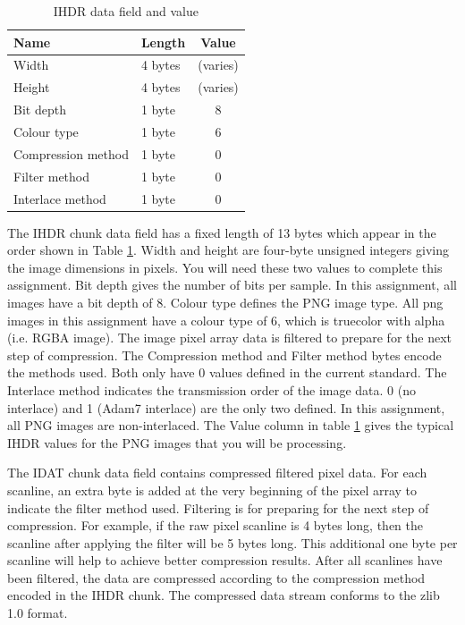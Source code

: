 \begin{table}
	\begin{center}
		\begin{tabular}{llc}             \toprule
			Name               & Length  & Value \\ \midrule
			Width              & 4 bytes & (varies)\\ \midrule
			Height             & 4 bytes & (varies)\\ \midrule
			Bit depth          & 1 byte  & 8\\ \midrule
			Colour type        & 1 byte  & 6\\ \midrule
			Compression method & 1 byte  & 0\\ \midrule
			Filter method      & 1 byte  & 0\\ \midrule
			Interlace method   & 1 byte  & 0\\ \bottomrule
		\end{tabular}
		\caption{IHDR data field and value}
		\label{lab1:tb_IHDR_Data}
	\end{center}
\end{table}
The IHDR chunk data field has a fixed length of 13 bytes which appear in the order shown in Table \ref{lab1:tb_IHDR_Data}. Width and height are four-byte unsigned integers giving the image dimensions in pixels. You will need these two values to complete this assignment. Bit depth gives the number of bits per sample. In this assignment, all images have a bit depth of 8. Colour type defines the PNG image type. All png images in this assignment have a colour type of 6, which is truecolor with alpha (i.e. RGBA image). The image pixel array data is filtered to prepare for the next step of compression. The Compression method and Filter method bytes encode the methods used. Both only have 0 values defined in the current standard. The Interlace method indicates the transmission order of the image data. 0 (no interlace) and 1 (Adam7 interlace) are the only two defined. In this assignment, all PNG images are non-interlaced. The Value column in table \ref{lab1:tb_IHDR_Data} gives the typical IHDR values for the PNG images that you will be processing.  

The IDAT chunk data field contains compressed filtered pixel data. For each scanline, an extra byte is added at the very beginning of the pixel array to indicate the filter method used. Filtering is for preparing for the next step of compression. For example, if the raw pixel scanline is 4 bytes long, then the scanline after applying the filter will be 5 bytes long. This additional one byte per scanline will help to achieve better compression results. After all scanlines have been filtered, the data are compressed according to the compression method encoded in the IHDR chunk. The compressed data stream conforms to the zlib 1.0 format.

